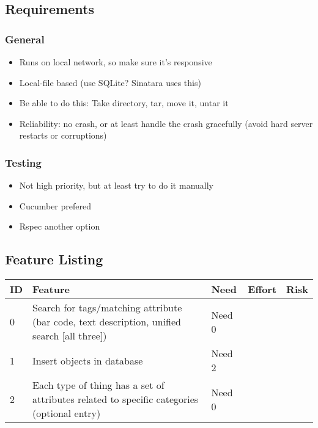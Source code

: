 \documentclass{article}
\begin{document}
\subsection{Requirements}
\subsubsection{General}
\begin{itemize}
\item Runs on local network, so make sure it's responsive
\item Local-file based (use SQLite? Sinatara uses this)
\item Be able to do this: Take directory, tar, move it, untar it
\item Reliability: no crash, or at least handle the crash gracefully (avoid hard server restarts or corruptions)
\end{itemize}

\subsubsection{Testing}
\begin{itemize}
\item Not high priority, but at least try to do it manually
\item Cucumber prefered
\item Rspec another option
\end{itemize}

\subsection{Feature Listing}
\begin{tabular}{ | p{0.25in} | p{3.25in} | p{0.5in} | p{0.5in} | p{0.5in} | }
\hline
ID & Feature & Need & Effort & Risk\\
\hline
0 & Search for tags/matching attribute (bar code, text description, unified search [all three]) & Need 0 &  & \\
\hline
1 & Insert objects in database & Need 2 &  & \\
\hline
2 & Each type of thing has a set of attributes related to specific categories (optional entry) & Need 0 &  & \\
\hline
\end{tabular}
\end{document}
